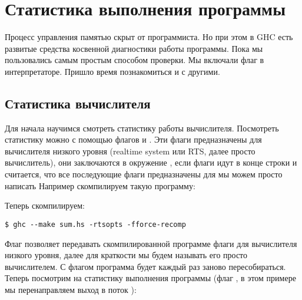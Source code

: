 \section{Статистика выполнения программы}

Процесс управления памятью скрыт от программиста. Но при этом в GHC есть
развитые средства косвенной диагностики работы программы. Пока мы
пользовались самым простым способом проверки. Мы включали флаг  в
интерпретаторе. Пришло время познакомиться и с другими.

\subsection{Статистика вычислителя}

Для начала научимся смотреть статистику работы вычислителя. Посмотреть
статистику можно с помощью флагов  и . Эти флаги
предназначены для вычислителя низкого уровня (realtime system или RTS,
далее просто вычислитель), они заключаются в окружение
, если флаги идут в конце строки и считается, что все
последующие флаги предназначены для  мы можем просто написать
 Например скомпилируем такую программу:



Теперь скомпилируем:


\begin{verbatim}
$ ghc --make sum.hs -rtsopts -fforce-recomp
\end{verbatim}

Флаг  позволяет передавать скомпилированной программе флаги
для вычислителя низкого уровня, далее для краткости мы будем называть
его просто вычислителем. С флагом  программа будет
каждый раз заново пересобираться. Теперь посмотрим на статистику
выполнения программы (флаг , в этом примере мы
перенаправляем выход в поток ):


